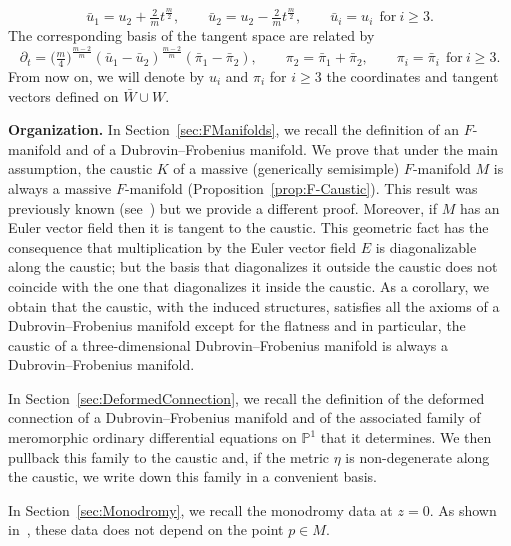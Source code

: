 \documentclass[10pt,a4paper]{amsart}
\numberwithin{equation}{section}
\begin{document}
\begin{equation}
 \label{eq:ChangeCoordinates}
 \bar{u}_{1}=u_{2}+\tfrac{2}{m}t^{\frac{m}{2}},\qquad
 \bar{u}_{2}=u_{2}-\tfrac{2}{m}t^{\frac{m}{2}},\qquad
 \bar{u}_{i}=u_{i} \ \ \mathrm{for} \ i\geq 3.
\end{equation}
The corresponding basis of the tangent space are related by
\begin{equation}
 \label{eq:ChangeBasis}
 \partial_{t}=\big( \tfrac{m}{4}\big)^{\frac{m-2}{m}}(\bar{u}_{1}-\bar{u}_{2})^{\frac{m-2}{m}}(\bar{\pi}_{1}-\bar{\pi}_{2}),\qquad
 \pi_{2}=\bar{\pi}_{1}+\bar{\pi}_{2},\qquad
 \pi_{i}=\bar{\pi}_{i} \ \ \mathrm{for}\ i\geq 3.
\end{equation}
From now on, we will denote by $u_{i}$ and $\pi_{i}$ for $i\geq 3$ the coordinates and tangent vectors defined on $\bar{W}\cup W$.

\textbf{Organization.} In Section~\ref{sec:FManifolds}, we recall the definition of an $F$-manifold and of a Dubrovin--Frobenius manifold. We prove that under the main assumption, the caustic $K$ of a massive (generically semisimple) $F$-manifold $M$ is always a massive $F$-manifold (Proposition~\ref{prop:F-Caustic}). This result was previously known (see~\cite[Theorem~2.10 and Example 2.5]{Strachan_2004}) but we provide a different proof. Moreover, if $M$ has an Euler vector field then it is tangent to the caustic. This geometric fact has the consequence that multiplication by the Euler vector field $E$ is diagonalizable along the caustic; but the basis that diagonalizes it outside the caustic does not coincide with the one that diagonalizes it inside the caustic. As a corollary, we obtain that the caustic, with the induced structures, satisfies all the axioms of a Dubrovin--Frobenius manifold except for the flatness and in particular, the caustic of a three-dimensional Dubrovin--Frobenius manifold is always a Dubrovin--Frobenius manifold.

In Section~\ref{sec:DeformedConnection}, we recall the definition of the deformed connection of a Dubrovin--Frobenius manifold and of the associated family of meromorphic ordinary differential equations on $\mathbb{P}^{1}$ that it determines. We then pullback this family to the caustic and, if the metric $\eta$ is non-degenerate along the caustic, we write down this family in a convenient basis.

In Section~\ref{sec:Monodromy}, we recall the monodromy data at $z=0$. As shown in~\cite{Dubrovin:1998fe}, these data does not depend on the point $p\in M$.
\end{document}
